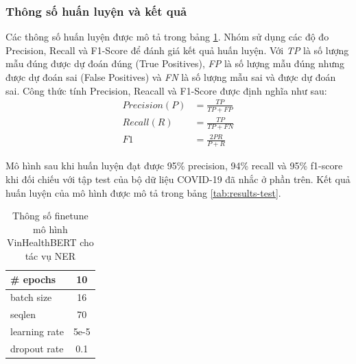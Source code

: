 \documentclass[12pt]{article}
\begin{document}
\subsubsection{Thông số huấn luyện và kết quả}
Các thông số huấn luyện được mô tả trong bảng \ref{tab:configurations}. Nhóm sử dụng các độ đo Precision, Recall và F1-Score để đánh giá kết quả huấn luyện. Với \textit{TP} là số lượng mẫu đúng được dự đoán đúng (True Positives), \textit{FP} là số lượng mẫu đúng nhưng được dự đoán sai (False Positives) và \textit{FN} là số lượng mẫu sai và được dự đoán sai. Công thức tính Precision, Reacall và F1-Score được định nghĩa như sau:
\begin{equation*}
\begin{aligned}
Precision (P) &= \frac{TP}{TP + FP} \\
Recall (R) &= \frac{TP}{TP + FN} \\
F1 &= \frac{2PR}{P + R}
\end{aligned}
\end{equation*}

Mô hình sau khi huấn luyện đạt được 95\% precision, 94\% recall và 95\% f1-score khi đối chiếu với tập test của bộ dữ liệu COVID-19 đã nhắc ở phần trên. Kết quả huấn luyện của mô hình được mô tả trong bảng \ref{tab:results-test}.
\begin{table}
\centering
\begin{tabular}{|l|c|}
\hline
\# epochs & 10 \\
\hline
batch size & 16 \\
\hline
seqlen & 70 \\
\hline
learning rate & 5e-5 \\
\hline
dropout rate & 0.1 \\
\hline
\end{tabular}
\caption{Thông số finetune mô hình VinHealthBERT cho tác vụ NER}
\label{tab:configurations}
\end{table}
\end{document}
